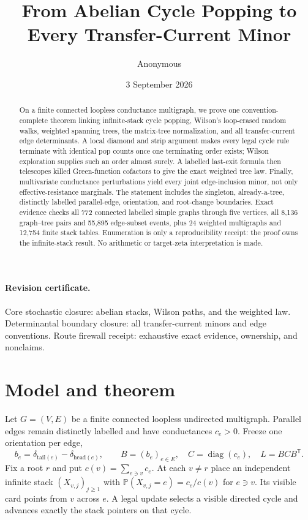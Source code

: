 \documentclass[10pt]{article}
\title{From Abelian Cycle Popping to Every Transfer-Current Minor}
\author{Anonymous}
\date{3 September 2026}
\providecommand{\CRevisionRound}{2}
\newcommand{\Prb}{\mathbb P}
\newcommand{\diag}{\operatorname{diag}}
\begin{document}
\maketitle
\vspace{-1.6em}

\begin{abstract}
On a finite connected loopless conductance multigraph, we prove one
convention-complete theorem linking infinite-stack cycle popping, Wilson's
loop-erased random walks, weighted spanning trees, the matrix-tree
normalization, and all transfer-current edge determinants.  A local diamond
and strip argument makes every legal cycle rule terminate with identical pop
counts once one terminating order exists; Wilson exploration supplies such an
order almost surely.  A labelled last-exit formula then telescopes killed
Green-function cofactors to give the exact weighted tree law.  Finally,
multivariate conductance perturbations yield every joint edge-inclusion minor,
not only effective-resistance marginals.  The statement includes the
singleton, already-a-tree, distinctly labelled parallel-edge, orientation,
and root-change boundaries.  Exact evidence checks all 772 connected labelled
simple graphs through five vertices, all 8,136 graph--tree pairs and 55,895
edge-subset events, plus 24 weighted multigraphs and 12,754 finite stack
tables.  Enumeration is only a reproducibility receipt: the proof owns the
infinite-stack result.  No arithmetic or target-zeta interpretation is made.
\end{abstract}

\paragraph{Revision certificate.}
\ifcase\CRevisionRound
Core stochastic closure: abelian stacks, Wilson paths, and the weighted law.
\or
Determinantal boundary closure: all transfer-current minors and edge conventions.
\else
Route firewall receipt: exhaustive exact evidence, ownership, and nonclaims.
\fi

\section{Model and theorem}
Let $G=(V,E)$ be a finite connected loopless undirected multigraph.  Parallel
edges remain distinctly labelled and have conductances $c_e>0$.  Freeze one
orientation per edge,
\[
 b_e=\delta_{\mathrm{tail}(e)}-\delta_{\mathrm{head}(e)},\qquad
 B=(b_e)_{e\in E},\quad C=\diag(c_e),\quad L=BCB^{\mathsf T}.
\]
Fix a root $r$ and put $c(v)=\sum_{e\ni v}c_e$.  At each $v\ne r$ place an
independent infinite stack $(X_{v,j})_{j\ge1}$ with
$\Prb(X_{v,j}=e)=c_e/c(v)$ for $e\ni v$.  Its visible card points from $v$
across $e$.  A legal update selects a visible directed cycle and advances
exactly the stack pointers on that cycle.
\end{document}
